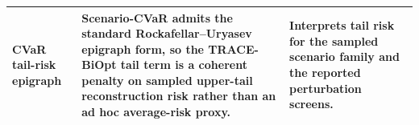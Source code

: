 \begin{table}[pos=htbp]
\begin{tabular}{>{\raggedright\arraybackslash}p{}>{\raggedright\arraybackslash}p{}>{\raggedright\arraybackslash}p{}}
CVaR tail-risk epigraph & Scenario-CVaR admits the standard Rockafellar--Uryasev epigraph form, so the TRACE-BiOpt tail term is a coherent penalty on sampled upper-tail reconstruction risk rather than an ad hoc average-risk proxy. & Interprets tail risk for the sampled scenario family and the reported perturbation screens. \\
\bottomrule
\end{tabular}
\end{table}
